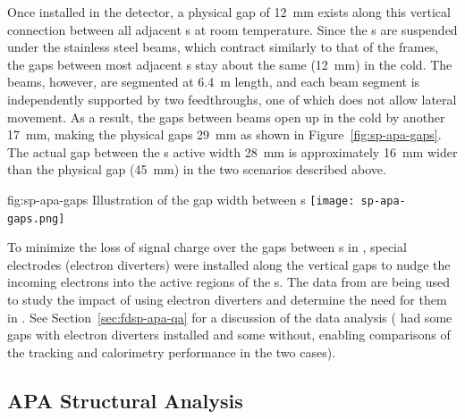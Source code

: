 Once installed in the detector, a physical gap of \SI{12}{mm} exists along this vertical connection between all adjacent s at room temperature. Since the s are suspended under the stainless steel  beams, which contract similarly to that of the  frames, the gaps between most adjacent s stay about the same (\SI{12}{mm}) in the cold.  The  beams, however, are segmented at \SI{6.4}{m} length, and each beam segment is independently supported by two  feedthroughs, one of which does not allow lateral movement.  As a result, the gaps between  beams open up in the cold by another \SI{17}{mm},  %
making the physical gaps \SI{29}{mm} as shown in Figure~\ref{fig:sp-apa-gaps}.  The actual gap between the s active width \SI{28}{mm} is approximately \SI{16}{mm} wider than the physical gap (\SI{45}{mm}) in the two scenarios described above.

\begin{dunefigure}{fig:sp-apa-gaps}
{Illustration of the gap width between s}  
\texttt{[image: sp-apa-gaps.png]} 
\end{dunefigure}

 
To minimize the loss of signal charge over the gaps between s in , special electrodes (electron diverters) were installed along the vertical gaps to nudge the incoming electrons into the active regions of the s. The data from  are being used to study the impact of using electron diverters and determine the need for them in .  See Section~\ref{sec:fdsp-apa-qa} for a discussion of the  data analysis ( had some gaps with electron diverters installed and some without, enabling comparisons of the tracking and calorimetry performance in the two cases). %





\subsection{APA Structural Analysis}

